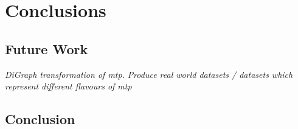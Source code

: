 \makeatletter
\def\toclevel@chapter{-1}
\makeatother
\chapter{Conclusions}

\section{Future Work}

\textit{DiGraph transformation of \gls{mtp}.}
\textit{Produce real world datasets / datasets which represent different flavours of mtp}
\section{Conclusion}


